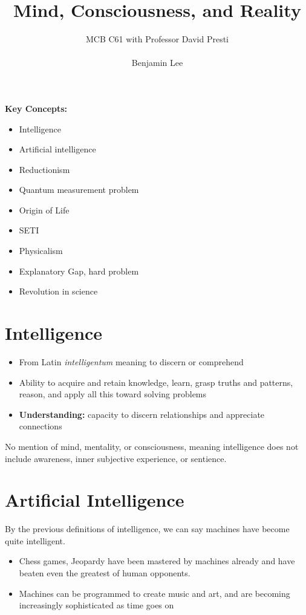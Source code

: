 \documentclass{article}
\title{Mind, Consciousness, and Reality}
\author{MCB C61 with Professor David Presti \\ \\ Benjamin Lee}
\begin{document}
\maketitle

\textbf{Key Concepts:}
\begin{itemize}
    \item Intelligence
    \item Artificial intelligence
    \item Reductionism
    \item Quantum measurement problem
    \item Origin of Life
    \item SETI
    \item Physicalism
    \item Explanatory Gap, hard problem
    \item Revolution in science
\end{itemize}

\newpage
\section{Intelligence}
\begin{itemize}
    \item From Latin \textit{intelligentum} meaning to discern or comprehend
    \item Ability to acquire and retain knowledge, learn, grasp truths and patterns, reason, and apply all this toward solving problems
    \item \textbf{Understanding:} capacity to discern relationships and appreciate connections
\end{itemize}

No mention of mind, mentality, or consciousness, meaning intelligence does not include awareness, inner subjective experience, or sentience.

\section{Artificial Intelligence}
By the previous definitions of intelligence, we can say machines have become quite intelligent. 

\begin{itemize}
    \item Chess games, Jeopardy have been mastered by machines already and have beaten even the greatest of human opponents. 
    \item Machines can be programmed to create music and art, and are becoming increasingly sophisticated as time goes on
\end{itemize}
\end{document}
